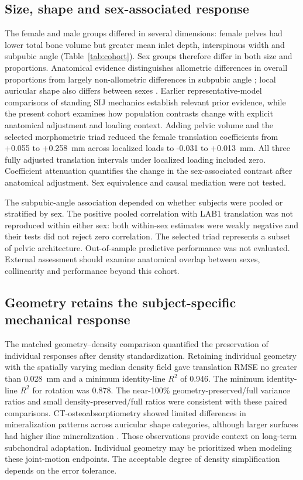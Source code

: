 \subsection*{Size, shape and sex-associated response}
The female and male groups differed in several dimensions: female pelves had lower total bone volume but greater mean inlet depth, interspinous width and subpubic angle (Table~\ref{tab:cohort}). Sex groups therefore differ in both size and proportions. Anatomical evidence distinguishes allometric differences in overall proportions from largely non-allometric differences in subpubic angle \citep{Fischer2017}; local auricular shape also differs between sexes \citep{Nishi2020}. Earlier representative-model comparisons of standing SIJ mechanics \citep{Joukar2018} establish relevant prior evidence, while the present cohort examines how population contrasts change with explicit anatomical adjustment and loading context. Adding pelvic volume and the selected morphometric triad reduced the female translation coefficients from +0.055 to +0.258~mm across localized loads to -0.031 to +0.013~mm. All three fully adjusted translation intervals under localized loading included zero. Coefficient attenuation quantifies the change in the sex-associated contrast after anatomical adjustment. Sex equivalence and causal mediation were not tested.

The subpubic-angle association depended on whether subjects were pooled or stratified by sex. The positive pooled correlation with LAB1 translation was not reproduced within either sex: both within-sex estimates were weakly negative and their tests did not reject zero correlation. The selected triad represents a subset of pelvic architecture. Out-of-sample predictive performance was not evaluated. External assessment should examine anatomical overlap between sexes, collinearity and performance beyond this cohort.

\subsection*{Geometry retains the subject-specific mechanical response}
The matched geometry--density comparison quantified the preservation of individual responses after density standardization. Retaining individual geometry with the spatially varying median density field gave translation RMSE no greater than 0.028~mm and a minimum identity-line $R^2$ of 0.946. The minimum identity-line $R^2$ for rotation was 0.878. The near-100\% geometry-preserved/full variance ratios and small density-preserved/full ratios were consistent with these paired comparisons. CT-osteoabsorptiometry showed limited differences in mineralization patterns across auricular shape categories, although larger surfaces had higher iliac mineralization \citep{Poilliot2023}. Those observations provide context on long-term subchondral adaptation. Individual geometry may be prioritized when modeling these joint-motion endpoints. The acceptable degree of density simplification depends on the error tolerance.

